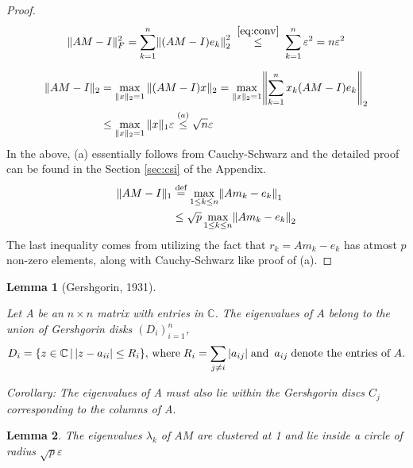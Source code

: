 \documentclass[paper=A4, fontsize=11pt]{scrartcl}
\let\originalleft\left
\let\originalright\right
\renewcommand{\left}{\mathopen{}\mathclose\bgroup\originalleft}
\renewcommand{\right}{\aftergroup\egroup\originalright}
\newtheorem{lemma}{Lemma}[section]
\theoremstyle{remark}
\begin{document}
\begin{proof}
\begin{align}
\|A M-I\|_{F}^{2}=\sum_{k=1}^{n}\left\|(A M-I) e_{k}\right\|_{2}^{2} \; \overset{\eqref{eq:conv}}{\leq} \; \sum_{k=1}^{n} \varepsilon^{2}=n \varepsilon^{2}
\end{align}

\begin{align}
\|A M-I\|_{2} &=\max _{\|x\|_{2}=1}\|(A M-I) x\|_{2} =\max _{\|x\|_{2}=1}\left\|\sum_{k=1}^{n} x_{k}(A M-I) e_{k}\right\|_{2} \\
&\leq \max _{\|x\|_{2}=1}\|x\|_{1} \varepsilon \overset{(a)}{\leq} \sqrt{n} \varepsilon
\end{align}
In the above, (a) essentially follows from Cauchy-Schwarz and the detailed proof can be found in the Section \ref{sec:csi} of the Appendix.
\begin{align}
\|A M-I\|_{1} &\overset{\text{def}}{=}\max_{1 \leq k \leq n}\left\|A m_k - e_k\right\|_{1} \label{l1matrix} \\
&\leq \sqrt{p} \max_{1 \leq k \leq n}\left\|A m_k - e_k\right\|_{2} 
\end{align}
The last inequality comes from utilizing the fact that $r_k = A m_k -e_k$ has atmost $p$ non-zero elements, along with Cauchy-Schwarz like proof of (a).

\end{proof}

\begin{lemma}[Gershgorin, 1931]\label{lma:gersh}
	
Let A be an $n \times n$ matrix with entries in $\mathbb{C}$. The eigenvalues of $A$ belong to the union of Gershgorin disks $(D_i)_{i=1}^n$,
\begin{equation}\label{gers1}
D_{i}=\left\{z \in \mathbb{C} \, | \, | z-a_{i i} | \leq R_{i}\right\},\,  \text{where} \; R_{i}=\sum_{j \neq i}\, \left|a_{i j}\right| \; \text{and } \, a_{i j} \; \text{denote the entries of }A.  \\
\end{equation}

Corollary: The eigenvalues of A must also lie within the Gershgorin discs $C_j$ corresponding to the columns of A. \\


\end{lemma}

\begin{lemma}\label{lma:cond}
The eigenvalues $\lambda_k$ of $AM$ are clustered at 1 and lie inside a circle of radius $\sqrt{p} \varepsilon$
\end{lemma}
\end{document}
